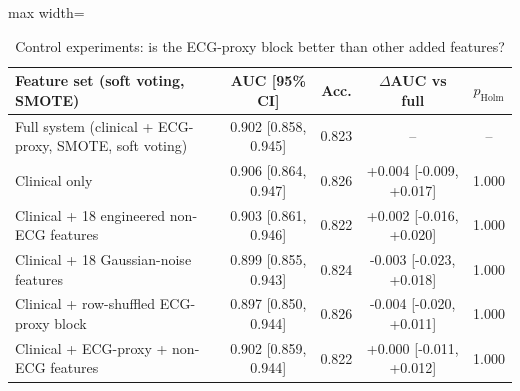 \begin{table}[!t]
\centering
\scriptsize
\caption{Control experiments: is the ECG-proxy block better than other added features?}
\label{tab:e2}
\setlength{\tabcolsep}{3pt}
\begin{adjustbox}{max width=\linewidth}
\begin{tabular}{lcccc}
\toprule
Feature set (soft voting, SMOTE) & AUC [95\% CI] & Acc. & $\Delta$AUC vs full & $p_{\mathrm{Holm}}$ \\
\midrule
Full system (clinical + ECG-proxy, SMOTE, soft voting) & 0.902 [0.858, 0.945] & 0.823 & -- & -- \\
Clinical only & 0.906 [0.864, 0.947] & 0.826 & +0.004 [-0.009, +0.017] & 1.000 \\
Clinical + 18 engineered non-ECG features & 0.903 [0.861, 0.946] & 0.822 & +0.002 [-0.016, +0.020] & 1.000 \\
Clinical + 18 Gaussian-noise features & 0.899 [0.855, 0.943] & 0.824 & -0.003 [-0.023, +0.018] & 1.000 \\
Clinical + row-shuffled ECG-proxy block & 0.897 [0.850, 0.944] & 0.826 & -0.004 [-0.020, +0.011] & 1.000 \\
Clinical + ECG-proxy + non-ECG features & 0.902 [0.859, 0.944] & 0.822 & +0.000 [-0.011, +0.012] & 1.000 \\
\bottomrule
\end{tabular}
\end{adjustbox}
\end{table}
